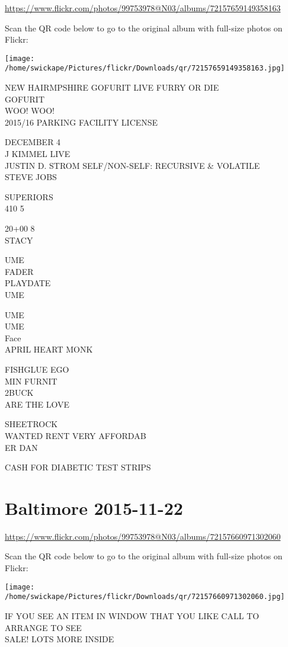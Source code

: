 \documentclass[10pt,letterpaper]{article}
\begin{document}
\url{https://www.flickr.com/photos/99753978@N03/albums/72157659149358163}

Scan the QR code below to go to the original album with full-size photos on Flickr:

\texttt{[image: /home/swickape/Pictures/flickr/Downloads/qr/72157659149358163.jpg]}


NEW HAIRMPSHIRE GOFURIT LIVE FURRY OR DIE\\
GOFURIT\\
WOO!  WOO!\\
2015/16 PARKING FACILITY LICENSE

DECEMBER 4\\
J KIMMEL LIVE\\
JUSTIN D. STROM SELF/NON{-}SELF: RECURSIVE \& VOLATILE\\
STEVE JOBS

SUPERIORS\\
410 5

20+00 8\\
STACY

UME\\
FADER\\
PLAYDATE\\
UME

UME\\
UME\\
Face\\
APRIL HEART MONK

FISHGLUE EGO\\
MIN FURNIT\\
2BUCK\\
ARE THE LOVE

SHEETROCK\\
WANTED RENT VERY AFFORDAB\\
ER DAN

CASH FOR DIABETIC TEST STRIPS


\section*{Baltimore 2015-11-22}

\url{https://www.flickr.com/photos/99753978@N03/albums/72157660971302060}

Scan the QR code below to go to the original album with full-size photos on Flickr:

\texttt{[image: /home/swickape/Pictures/flickr/Downloads/qr/72157660971302060.jpg]}


IF YOU SEE AN ITEM IN WINDOW THAT YOU LIKE CALL TO ARRANGE TO SEE\\
SALE!  LOTS MORE INSIDE
\end{document}
